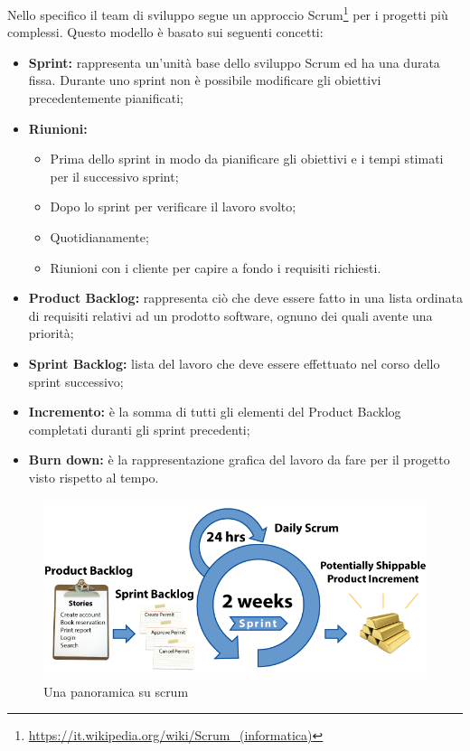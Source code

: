 Nello specifico il team di sviluppo segue un approccio Scrum\footnote{\url{https://it.wikipedia.org/wiki/Scrum_(informatica)}} per i progetti più complessi. Questo modello è basato sui seguenti concetti:
\begin{itemize}
	\item \textbf{Sprint: }rappresenta un'unità base dello sviluppo Scrum ed ha una durata fissa. Durante uno sprint non è possibile modificare gli obiettivi precedentemente pianificati;
	\item\textbf{Riunioni: }
	\begin{itemize}
		\item Prima dello sprint in modo da pianificare gli obiettivi e i tempi stimati per il successivo sprint;
		\item Dopo lo sprint per verificare il lavoro svolto;
		\item Quotidianamente;
		\item Riunioni con i cliente per capire a fondo i requisiti richiesti.
	\end{itemize}
	\item \textbf{Product Backlog: }rappresenta ciò che deve essere fatto in una lista ordinata di requisiti relativi ad un prodotto software, ognuno dei quali avente una priorità;
	\item \textbf{Sprint Backlog: }lista del lavoro che deve essere effettuato nel corso dello sprint successivo;
	\item \textbf{Incremento: }è la somma di tutti gli elementi del Product Backlog completati duranti gli sprint precedenti;
	\item \textbf{Burn down: }è la rappresentazione grafica del lavoro da fare per il progetto visto rispetto al tempo.
\end{itemize}

\begin{figure}[h]
\centering
\includegraphics[width=0.7\linewidth]{immagini/scrum}
\caption[Una panoramica su scrum]{Una panoramica su scrum}
\label{fig:scrum}
\end{figure}


